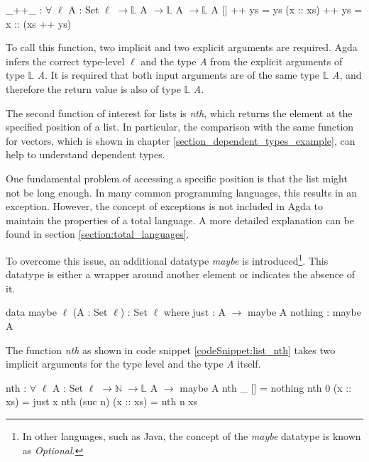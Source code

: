 \begin{codesnippet}[mathescape=true, caption={List concatenation function}, label={codeSnippet:list_append}]
_++_ : $\forall$ {$\ell$} {A : Set $\ell$} $\rightarrow \mathbb{L}$ A $\rightarrow \mathbb{L}$ A $\rightarrow \mathbb{L}$ A
  []        ++ ys = ys
  (x :: xs) ++ ys = x :: (xs ++ ys)
\end{codesnippet}

To call this function, two implicit and two explicit arguments are required. 
Agda infers the correct type-level $\ell$ and the type \emph{A} from the explicit arguments of type $\mathbb{L}$ \emph{A}. 
It is required that both input arguments are of the same type $\mathbb{L}$ \emph{A}, and therefore the return value is also of type $\mathbb{L}$ \emph{A}.

The second function of interest for lists is \emph{nth}, which returns the element at the specified position of a list.
In particular, the comparison with the same function for vectors, which is shown in chapter \ref{section_dependent_types_example}, can help to understand dependent types.

One fundamental problem of accessing a specific position is that the list might not be long enough.
In many common programming languages, this results in an exception. However, the concept of exceptions is not included in Agda to maintain the properties of a total language.
A more detailed explanation can be found in section \ref{section:total_languages}.

To overcome this issue, an additional datatype \emph{maybe} is introduced\footnote{In other languages, such as Java, the concept of the \emph{maybe} datatype is known as \emph{Optional}.}.
This datatype is either a wrapper around another element or indicates the absence of it.

\begin{codesnippet}[mathescape=true, caption={Maybe datatype}, label={codeSnippet:maybe_datatype}]
data maybe {$\ell$} (A : Set $\ell$) : Set $\ell$ where
  just : A $\rightarrow$ maybe A
  nothing : maybe A
\end{codesnippet}

The function \emph{nth} as shown in code snippet \ref{codeSnippet:list_nth} takes two implicit arguments for the type level and the type \emph{A} itself.

\begin{codesnippet}[mathescape=true, caption={\emph{Nth} function for lists}, label={codeSnippet:list_nth}]
nth : $\forall$ {$\ell$} {A : Set $\ell$} $\rightarrow \mathbb{N}$ $\rightarrow \mathbb{L}$ A $\rightarrow$ maybe A
nth _ [] = nothing
nth 0 (x :: xs) = just x
nth (suc n) (x :: xs) = nth n xs
\end{codesnippet}

